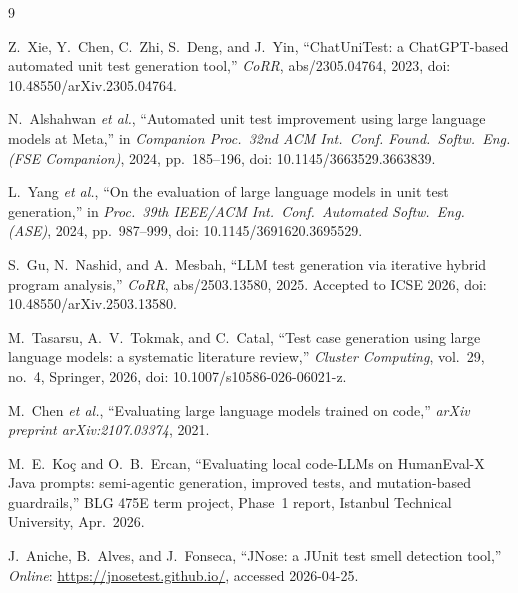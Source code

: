 \documentclass[journal]{IEEEtran}
\begin{document}
\begin{thebibliography}{9}

Z.~Xie, Y.~Chen, C.~Zhi, S.~Deng, and J.~Yin, ``ChatUniTest: a
ChatGPT-based automated unit test generation tool,'' \emph{CoRR},
abs/2305.04764, 2023, doi: 10.48550/arXiv.2305.04764.

N.~Alshahwan \emph{et al.}, ``Automated unit test improvement using large
language models at Meta,'' in \emph{Companion Proc.\ 32nd ACM Int.\ Conf.
Found.\ Softw.\ Eng. (FSE Companion)}, 2024, pp.~185--196, doi:
10.1145/3663529.3663839.

L.~Yang \emph{et al.}, ``On the evaluation of large language models in
unit test generation,'' in \emph{Proc.\ 39th IEEE/ACM Int.\ Conf.\
Automated Softw.\ Eng. (ASE)}, 2024, pp.~987--999, doi:
10.1145/3691620.3695529.

S.~Gu, N.~Nashid, and A.~Mesbah, ``LLM test generation via iterative
hybrid program analysis,'' \emph{CoRR}, abs/2503.13580, 2025. Accepted
to ICSE 2026, doi: 10.48550/arXiv.2503.13580.

M.~Tasarsu, A.~V.\ Tokmak, and C.~Catal, ``Test case generation using
large language models: a systematic literature review,'' \emph{Cluster
Computing}, vol.~29, no.~4, Springer, 2026, doi:
10.1007/s10586-026-06021-z.

M.~Chen \emph{et al.}, ``Evaluating large language models trained on
code,'' \emph{arXiv preprint arXiv:2107.03374}, 2021.

M.~E.~Ko\c{c} and O.~B.~Ercan, ``Evaluating local code-LLMs on HumanEval-X
Java prompts: semi-agentic generation, improved tests, and mutation-based
guardrails,'' BLG 475E term project, Phase~1 report, Istanbul Technical
University, Apr.\ 2026.

J.~Aniche, B.~Alves, and J.~Fonseca, ``JNose: a JUnit test smell detection
tool,'' \emph{Online}: \url{https://jnosetest.github.io/}, accessed
2026-04-25.

\end{thebibliography}
\end{document}
